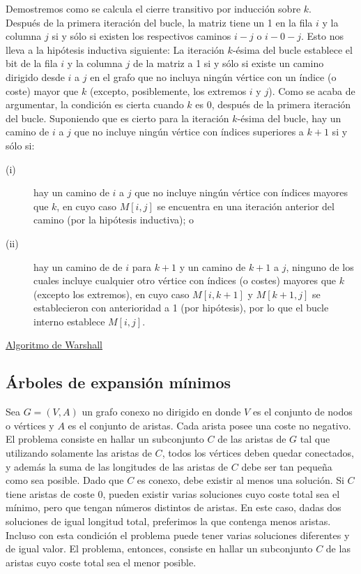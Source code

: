 Demostremos como se calcula el cierre transitivo por inducción sobre $k$.\\

Después de la primera iteración del bucle, la matriz tiene un 1 en la fila $i$ y la columna $j$ si y sólo si existen los respectivos caminos $i-j$ o $i-0-j$. Esto nos lleva a la hipótesis inductiva siguiente: La iteración $k$-ésima del bucle establece el bit de la fila $i$ y la columna $j$ de la matriz a 1 si y sólo si existe un camino dirigido desde $i$ a $j$ en el grafo que no incluya ningún vértice con un índice (o coste) mayor que $k$ (excepto, posiblemente, los extremos $i$ y $j$). Como se acaba de argumentar, la condición es cierta cuando $k$ es 0, después de la primera iteración del bucle. Suponiendo que es cierto para la iteración $k$-ésima del bucle, hay un camino de $i$ a $j$ que no incluye ningún vértice con índices superiores a $k+1$ si y sólo si:
\begin{description}
\item[(i)] hay un camino de $i$ a $j$ que no incluye ningún vértice con índices mayores que $k$, en cuyo caso $M[i,j]$ se encuentra en una iteración anterior del camino (por la hipótesis inductiva); o 
\item[(ii)] hay un camino de de $i$ para $k+1$ y un camino de $k+1$ a $j$, ninguno de los cuales incluye cualquier otro vértice con índices (o costes) mayores que $k$ (excepto los extremos), en cuyo caso $M[i,k+1]$ y $M[k+1,j]$ se establecieron con anterioridad a 1 (por hipótesis), por lo que el bucle interno establece $M[i,j]$.
\end{description}

\underline{Algoritmo de Warshall}\\


\subsection{Árboles de expansión mínimos}

Sea $G = (V,A)$ un grafo conexo no dirigido en donde $V$ es el conjunto de nodos o vértices y $A$ es el conjunto de aristas. Cada arista posee una coste no negativo. El problema consiste en hallar un subconjunto $C$ de las aristas de $G$ tal que utilizando solamente las aristas de $C$, todos los vértices deben quedar conectados, y además la suma de las longitudes de las aristas de $C$ debe ser tan pequeña como sea posible. Dado que $C$ es conexo, debe existir al menos una solución. Si $C$ tiene aristas de coste 0, pueden existir varias soluciones cuyo coste total sea el mínimo, pero que tengan números distintos de aristas. En este caso, dadas dos soluciones de igual longitud total, preferimos la que contenga menos aristas. Incluso con esta condición el problema puede tener varias soluciones diferentes y de igual valor. El problema, entonces, consiste en hallar un subconjunto $C$ de las aristas cuyo coste total sea el menor posible.\\


